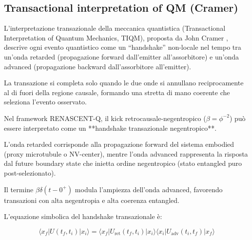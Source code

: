 \documentclass[11pt,a4paper]{article}
\let\oldcite\cite
\renewcommand{\cite}{\protect\oldcite}
\theoremstyle{plain}
\theoremstyle{definition}
\begin{document}
\subsection{Transactional interpretation of QM (Cramer)}

\vspace{0.2cm}

L'interpretazione transazionale della meccanica quantistica (Transactional Interpretation of Quantum Mechanics, TIQM), proposta da John Cramer \cite{cramer_transactional_1986}, descrive ogni evento quantistico come un “handshake” non-locale nel tempo tra un'onda retarded (propagazione forward dall'emitter all'assorbitore) e un'onda advanced (propagazione backward dall'assorbitore all'emitter). 


\vspace{0.4cm}



La transazione si completa solo quando le due onde si annullano reciprocamente al di fuori della regione causale, formando una stretta di mano coerente che seleziona l'evento osservato.

\vspace{0.5cm}

Nel framework RENASCENT-Q, il kick retrocausale-negentropico ($\beta = \phi^{-2}$) può essere interpretato come un **handshake transazionale negentropico**. 


\vspace{0.4cm}


L'onda retarded corrisponde alla propagazione forward del sistema embodied (proxy microtubule o NV-center), mentre l'onda advanced rappresenta la risposta dal future boundary state che inietta ordine negentropico (stato entangled puro post-selezionato). 


\vspace{0.2cm}

Il termine $\beta \delta(t-0^+)$ modula l'ampiezza dell'onda advanced, favorendo transazioni con alta negentropia e alta coerenza entangled.


\clearpage

L'equazione simbolica del handshake transazionale è:

\vspace{0.2cm}

\begin{equation}
\langle x_f | U(t_f, t_i) | x_i \rangle = \langle x_f | U_{\text{ret}}(t_f, t_i) | x_i \rangle \langle x_i | U_{\text{adv}}(t_i, t_f) | x_f \rangle
\label{eq:transactional_handshake}
\end{equation}
\end{document}
